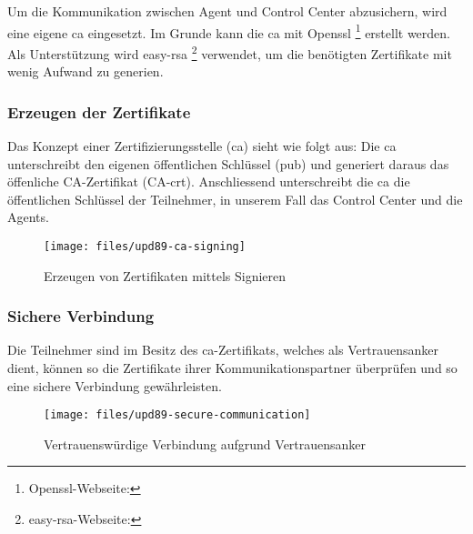 Um die Kommunikation zwischen Agent und Control Center abzusichern, wird eine eigene \gls{ca} eingesetzt. Im Grunde kann die \gls{ca} mit Openssl \footnote{Openssl-Webseite: } erstellt werden. Als Unterstützung wird easy-rsa \footnote{easy-rsa-Webseite: } verwendet, um die benötigten Zertifikate mit wenig Aufwand zu generien.

\subsubsection*{Erzeugen der Zertifikate}
Das Konzept einer Zertifizierungsstelle (\gls{ca}) sieht wie folgt aus: Die \gls{ca} unterschreibt den eigenen öffentlichen Schlüssel (pub) und generiert daraus das öffenliche CA-Zertifikat (CA-crt). Anschliessend unterschreibt die \gls{ca} die öffentlichen Schlüssel der Teilnehmer, in unserem Fall das Control Center und die Agents.

\begin{figure}
  \centering
    \texttt{[image: files/upd89-ca-signing]}
  \caption{Erzeugen von Zertifikaten mittels Signieren}
  \label{fig:sec-signin}
\end{figure}

\clearpage
\subsubsection*{Sichere Verbindung}

Die Teilnehmer sind im Besitz des \gls{ca}-Zertifikats, welches als Vertrauensanker dient, können so die Zertifikate ihrer Kommunikationspartner überprüfen und so eine sichere Verbindung gewährleisten.


\begin{figure}
  \centering
    \texttt{[image: files/upd89-secure-communication]}
  \caption{Vertrauenswürdige Verbindung aufgrund Vertrauensanker}
  \label{fig:sec-connection}
\end{figure}
